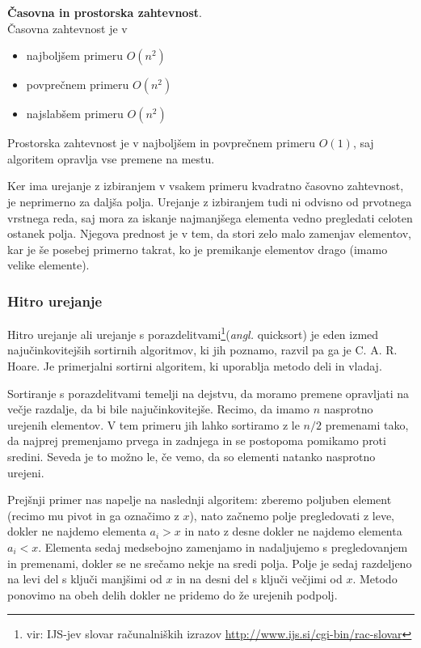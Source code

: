 \documentclass[a4paper,oneside]{article}
\begin{document}
\textbf{Časovna in prostorska zahtevnost}. \\
Časovna zahtevnost je v 
\begin{itemize}
  \item najboljšem primeru $O(n^2)$
  \item povprečnem primeru $O(n^2)$
  \item najslabšem primeru $O(n^2)$
\end{itemize}

Prostorska zahtevnost je v najboljšem in povprečnem primeru $O(1)$, 
saj algoritem opravlja vse premene na mestu.

Ker ima urejanje z izbiranjem v vsakem primeru kvadratno časovno zahtevnost, je neprimerno
za daljša polja. Urejanje z izbiranjem tudi ni odvisno od prvotnega vrstnega reda,
saj mora za iskanje najmanjšega elementa vedno pregledati celoten ostanek polja.
Njegova prednost je v tem, da stori zelo malo zamenjav elementov, kar je še posebej
primerno takrat, ko je premikanje elementov drago (imamo velike elemente).

\subsubsection{Hitro urejanje}
\label{chapter:quicksort}
Hitro urejanje ali urejanje s porazdelitvami\footnote{vir: IJS-jev slovar računalniških izrazov
\url{http://www.ijs.si/cgi-bin/rac-slovar}}(\emph{angl.} quicksort) je eden izmed
najučinkovitejših sortirnih algoritmov, ki jih poznamo, razvil pa ga je C. A. R. Hoare.
Je primerjalni sortirni algoritem, ki uporablja metodo deli in vladaj.

Sortiranje s porazdelitvami temelji na dejstvu, da moramo premene opravljati na večje
razdalje, da bi bile najučinkovitejše. Recimo, da imamo $n$ nasprotno urejenih elementov.
V tem primeru jih lahko sortiramo z le $n/2$ premenami tako, da najprej premenjamo prvega
in zadnjega in se postopoma pomikamo proti sredini. Seveda je to možno le, če vemo, da so 
elementi natanko nasprotno urejeni.

Prejšnji primer nas napelje na naslednji algoritem: 
zberemo poljuben element (recimo mu pivot in ga označimo z $x$), nato začnemo 
polje pregledovati z leve, dokler ne najdemo elementa $a_i > x$ in nato z desne dokler ne 
najdemo elementa $a_i < x$. Elementa sedaj medsebojno zamenjamo in nadaljujemo s 
pregledovanjem in premenami, dokler se ne srečamo nekje na sredi polja.
Polje je sedaj razdeljeno na levi del s ključi manjšimi od $x$ in na desni del
s ključi večjimi od $x$. Metodo ponovimo na obeh delih dokler ne pridemo do že urejenih
podpolj. 
\end{document}
